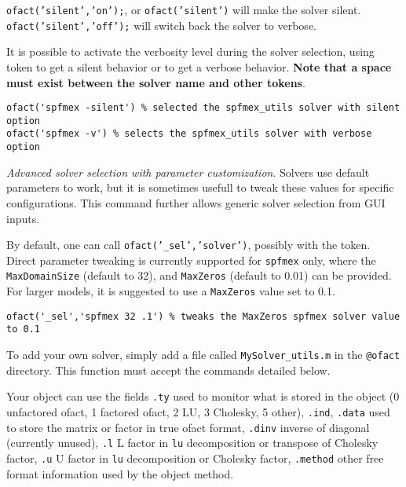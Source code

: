\begin{SDT}
{\tt ofact('silent','on');}, or {\tt ofact('silent')} will make the solver silent.
{\tt ofact('silent','off');} will switch back the solver to verbose.

It is possible to activate the verbosity level during the solver selection, using token  to get a silent behavior or  to get a verbose behavior. {\bf Note that a space must exist between the solver name and other tokens}.

\begin{verbatim}
ofact('spfmex -silent') % selected the spfmex_utils solver with silent option
ofact('spfmex -v') % selects the spfmex_utils solver with verbose option
\end{verbatim}



{\it Advanced solver selection with parameter customization}.
Solvers use default parameters to work, but it is sometimes usefull to tweak these values for specific configurations. This command further allows generic solver selection from GUI inputs.

By default, one can call {\tt ofact('\_sel','solver')}, possibly with the  token. Direct parameter tweaking is currently supported for {\tt spfmex} only, where the {\tt MaxDomainSize} (default to 32), and {\tt MaxZeros} (default to 0.01) can be provided. For larger models, it is suggested to use a {\tt MaxZeros} value set to 0.1.

\begin{verbatim}
ofact('_sel','spfmex 32 .1') % tweaks the MaxZeros spfmex solver value to 0.1
\end{verbatim}



\end{SDT}

To add your own solver, simply add a file called {\tt MySolver\_utils.m} in the {\tt \verb+@+ofact} directory. This function must accept the commands detailed below.

Your object can use the fields {\tt .ty} used to monitor what is stored in the object (0 unfactored ofact, 1 factored ofact, 2 LU, 3 Cholesky, 5 other), {\tt .ind}, {\tt .data} used to store the matrix or factor in true ofact format, {\tt .dinv} inverse of diagonal (currently unused), {\tt .l} L factor in {\tt lu} decomposition or transpose of Cholesky factor, {\tt .u} U factor in {\tt lu} decomposition or Cholesky factor, {\tt .method} other free format information used by the object method.

